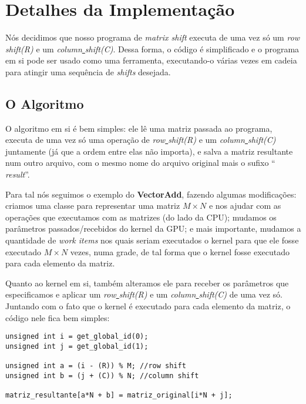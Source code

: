 




\cabecalho

\section{Detalhes da Implementação}

Nós decidimos que nosso programa de \textit{matrix shift} executa de uma vez só
um \textit{row\underline{ }shift(R)} e um \textit{column\underline{ }shift(C)}.
Dessa forma, o código é simplificado e o programa em si pode ser usado como uma
ferramenta, executando-o várias vezes em cadeia para atingir uma sequência de 
\textit{shifts} desejada.

\subsection{O Algoritmo}
O algoritmo em si é bem simples: ele lê uma matriz passada ao programa, executa
de uma vez só uma operação de \textit{row\underline{ }shift(R)} e um 
\textit{column\underline{ }shift(C)} juntamente (já que a ordem entre elas não importa),
e salva a matriz resultante num outro arquivo, com o mesmo nome do arquivo original mais
o sufixo \textquotedblleft\textit{\underline{ }result}\textquotedblright.

Para tal nós seguimos o exemplo do \textbf{VectorAdd}, fazendo algumas modificações: 
criamos uma classe para representar uma matriz $M\times N$ e nos ajudar com as operações que executamos
com as matrizes (do lado da CPU); mudamos os parâmetros passados/recebidos do kernel da
GPU; e mais importante, mudamos a quantidade de \textit{work items} nos quais seriam executados
o kernel para que ele fosse executado $M\times N$ vezes, numa grade, de tal forma que o kernel fosse
executado para cada elemento da matriz.

Quanto ao kernel em si, também alteramos ele para receber os parâmetros que especificamos e 
aplicar um \textit{row\underline{ }shift(R)} e um \textit{column\underline{ }shift(C)} de uma vez
só. Juntando com o fato que o kernel é executado para cada elemento da matriz, o código nele fica bem simples:
\begin{verbatim}
unsigned int i = get_global_id(0);
unsigned int j = get_global_id(1);

unsigned int a = (i - (R)) % M; //row shift
unsigned int b = (j + (C)) % N; //column shift

matriz_resultante[a*N + b] = matriz_original[i*N + j];

\end{verbatim}

